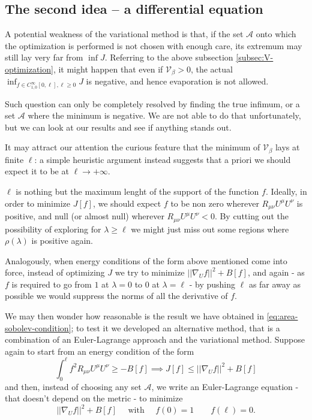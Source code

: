 \subsection{The second idea -- a differential equation}
\label{subsec:E-L-optimization}
A potential weakness of the variational method is that, if the set \(\mathcal{A}\) onto which the optimization is performed is not chosen with enough care, its extremum may still lay very far from \(\inf J\). Referring to the above subsection \ref{subsec:V-optimization}, it might happen that even if \(\mathcal{V}_{\beta} > 0\), the actual \(\inf_{f\in C^{\infty}_{1,0}[0, \ell], \ell \ge 0}J\) is negative, and hence evaporation is not allowed.

Such question can only be completely resolved by finding the true infimum, or a set \(\mathcal{A}\) where the minimum is negative. We are not able to do that unfortunately, but we can look at our results and see if anything stands out. 

It may attract our attention the curious feature that the minimum of \(\mathcal{V}_{\beta}\) lays at finite \(\ell\): a simple heuristic argument instead suggests that a priori we should expect it to be at \(\ell \rightarrow +\infty\).

\(\ell\) is nothing but the maximum lenght of the support of the function \(f\). Ideally, in order to minimize \(J[f]\), we should expect \(f\) to be non zero wherever \(R_{\mu\nu}U^{\mu}U^{\nu}\) is positive, and null (or almost null) wherever \(R_{\mu\nu}U^{\mu}U^{\nu} < 0\). By cutting out the possibility of exploring for \(\lambda \ge \ell\) we might just miss out some regions where \(\rho(\lambda)\) is positive again. 

\noindent
Analogously, when energy conditions of the form above mentioned come into force, instead of optimizing \(J\) we try to minimize \(\vert\vert \nabla_U f\vert\vert^2 + B[f]\), and again - as \(f\) is required to go from \(1\) at \(\lambda = 0\) to \(0\) at \(\lambda = \ell\) - by pushing \(\ell\) as far away as possible we would suppress the norms of all the derivative of \(f\).

We may then wonder how reasonable is the result we have obtained in \eqref{eq:area-sobolev-condition}; to test it we developed an alternative method, that is a combination of an Euler-Lagrange approach and the variational method. Suppose again to start from an energy condition of the form
	\[
		\int_0^{\ell} f^2 R_{\mu\nu}U^{\mu}U^{\nu} \ge -B[f] \implies J[f] \le \vert\vert \nabla_U f\vert\vert^2 + B[f]
	\]
and then, instead of choosing any set \(\mathcal{A}\), we write an Euler-Lagrange equation - that doesn't depend on the metric - to minimize 
	\[
	\vert\vert \nabla_U f\vert\vert^2 + B[f] \quad\text{ with }\quad f(0) = 1 \quad \quad f(\ell) = 0.	
	\]

